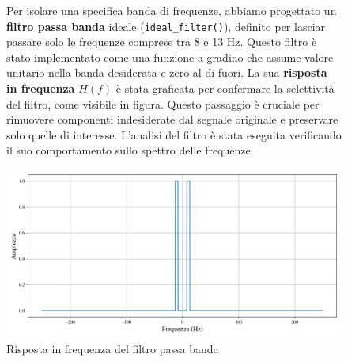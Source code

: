 \documentclass{report}
\begin{document}
\begin{figure}[!h]
\begin{minipage}{0.4\textwidth}
	Per isolare una specifica banda di frequenze, abbiamo progettato un \textbf{filtro passa banda} ideale (\texttt{ideal\_filter()\footnotemark}), definito per lasciar passare solo le frequenze comprese tra 8 e 13 Hz. Questo filtro è stato implementato come una funzione a gradino che assume valore unitario nella banda desiderata e zero al di fuori. La sua \textbf{risposta in frequenza} $H(f)$ è stata graficata per confermare la selettività del filtro, come visibile in figura. Questo passaggio è cruciale per rimuovere componenti indesiderate dal segnale originale e preservare solo quelle di interesse. L’analisi del filtro è stata eseguita verificando il suo comportamento sullo spettro delle frequenze.
\end{minipage}
\hfill
\hspace{0.5cm}
\begin{minipage}{0.55\textwidth}
\centering
\includegraphics[width=\textwidth]{plot4}
\caption{Risposta in frequenza del filtro passa banda}    
\end{minipage}
\end{figure}
\end{document}
